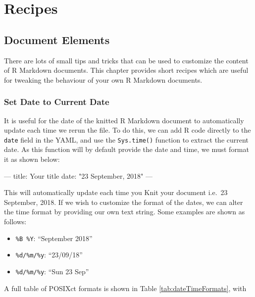 \documentclass[]{book}
\newenvironment{Shaded}{\begin{snugshade}}{\end{snugshade}}
\newcommand{\StringTok}[1]{\textcolor[rgb]{0.31,0.60,0.02}{#1}}
\newcommand{\OtherTok}[1]{\textcolor[rgb]{0.56,0.35,0.01}{#1}}
\newcommand{\FunctionTok}[1]{\textcolor[rgb]{0.00,0.00,0.00}{#1}}
\newcommand{\AttributeTok}[1]{\textcolor[rgb]{0.77,0.63,0.00}{#1}}
\providecommand{\tightlist}{%
  \setlength{\itemsep}{0pt}\setlength{\parskip}{0pt}}
\begin{document}
\part{Recipes}\label{part-recipes}

\chapter{Document Elements}\label{document-elements}

There are lots of small tips and tricks that can be used to customize
the content of R Markdown documents. This chapter provides short recipes
which are useful for tweaking the behaviour of your own R Markdown
documents.

\section{Set Date to Current Date}\label{set-date-to-current-date}

It is useful for the date of the knitted R Markdown document to
automatically update each time we rerun the file. To do this, we can add
R code directly to the \texttt{date} field in the YAML, and use the
\texttt{Sys.time()} function to extract the current date. As this
function will by default provide the date and time, we must format it as
shown below:

\begin{Shaded}
\begin{Highlighting}[]
\OtherTok{---}
\FunctionTok{title:}\AttributeTok{ Your title}
\FunctionTok{date:}\AttributeTok{ }\StringTok{"23 September, 2018"}
\OtherTok{---}
\end{Highlighting}
\end{Shaded}

This will automatically update each time you Knit your document i.e.~23
September, 2018. If we wish to customize the format of the dates, we can
alter the time format by providing our own text string. Some examples
are shown as follows:

\begin{itemize}
\tightlist
\item
  \texttt{\%B\ \%Y}: ``September 2018''
\item
  \texttt{\%d/\%m/\%y}: ``23/09/18''
\item
  \texttt{\%d/\%m/\%y}: ``Sun 23 Sep''
\end{itemize}

A full table of POSIXct formats is shown in Table
\ref{tab:dateTimeFormats}, with
\end{document}
